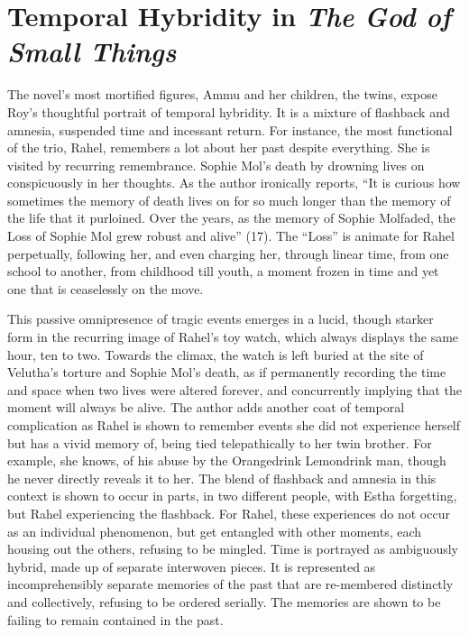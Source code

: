 \section{Temporal Hybridity in \emph{The God of Small Things}}

The novel’s most mortified figures, Ammu and her children, the twins, expose Roy’s thoughtful portrait of temporal hybridity. It is a mixture of flashback and amnesia, suspended time and incessant return.  For instance,  the most functional of the trio, Rahel, remembers a lot about her past despite everything. She is visited by recurring remembrance. Sophie Mol’s death by drowning lives on conspicuously in her thoughts. As the author ironically reports, “It is curious how sometimes the memory of death lives on for so much longer than the memory of the life that it purloined. Over the years, as the memory of Sophie Mol\ldotsslowly faded, the Loss of Sophie Mol grew robust and alive” (17). The “Loss” is animate for Rahel perpetually, following her, and even charging her, through linear time, from one school to another, from childhood till youth, a moment frozen in time and yet one that is ceaselessly on the move. 

This passive omnipresence of tragic events emerges in a lucid, though starker form in the recurring image of Rahel’s toy watch, which always displays the same hour, ten to two. Towards the climax, the watch is left buried at the site of Velutha’s torture and Sophie Mol’s death, as if permanently recording the time and space when two lives were altered forever, and concurrently implying that the moment will always be alive. The author adds another coat of temporal complication as Rahel is shown to remember events she did not experience herself but has a vivid memory of, being tied telepathically to her twin brother. For example, she knows, of his abuse by the Orangedrink Lemondrink man, though he never directly reveals it to her. The blend of flashback and amnesia in this context is shown to occur in parts, in two different people, with Estha forgetting, but Rahel experiencing the flashback. For Rahel, these experiences do not occur as an individual phenomenon, but get entangled with other moments, each housing out the others, refusing to be mingled. Time is portrayed as ambiguously hybrid, made up of separate interwoven pieces. It is represented as incomprehensibly separate memories of the past that are re-membered distinctly and collectively, refusing to be ordered serially.  The memories are shown to be failing to remain contained in the past. 


